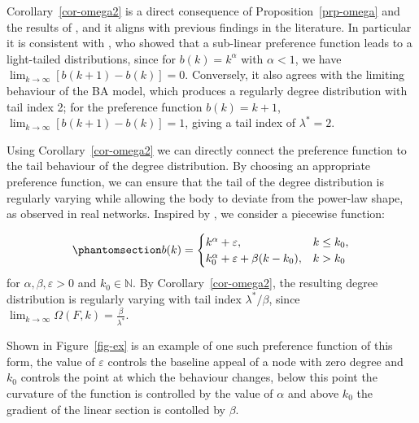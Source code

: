 \documentclass[
  sn-basic,
  10pt,
]{sn-jnl}
\theoremstyle{thmstyleone}
\theoremstyle{thmstyleone}
\theoremstyle{remark}
\theoremstyle{plain}
\theoremstyle{plain}
\theoremstyle{remark}
\begin{document}
Corollary~\ref{cor-omega2} is a direct consequence of
Proposition~\ref{prp-omega} and the results of \citet{shimura12}, and it
aligns with previous findings in the literature. In particular it is
consistent with \citet{krapivsky01}, who showed that a sub-linear
preference function leads to a light-tailed distributions, since for
\(b(k)=k^\alpha\) with \(\alpha<1\), we have
\(\lim_{k\rightarrow\infty}[b(k+1)-b(k)]=0\). Conversely, it also agrees
with the limiting behaviour of the BA model, which produces a regularly
degree distribution with tail index 2; for the preference function
\(b(k)=k+1\), \(\lim_{k\rightarrow\infty}[b(k+1)-b(k)]=1\), giving a
tail index of \(\lambda^*=2\).

Using Corollary~\ref{cor-omega2} we can directly connect the preference
function to the tail behaviour of the degree distribution. By choosing
an appropriate preference function, we can ensure that the tail of the
degree distribution is regularly varying while allowing the body to
deviate from the power-law shape, as observed in real networks. Inspired
by \citet{Lee24}, we consider a piecewise function:

\begin{equation}\phantomsection\label{eq-pref}{
b(k) = \begin{cases}
k^\alpha + \varepsilon,&k\le k_0,\\
k_0^\alpha + \varepsilon + \beta(k-k_0), &k> k_0
\end{cases}
}\end{equation} for \(\alpha,\beta, \varepsilon>0\) and
\(k_0\in\mathbb N\). By Corollary~\ref{cor-omega2}, the resulting degree
distribution is regularly varying with tail index \(\lambda^*/\beta\),
since
\(\lim_{k\rightarrow\infty}\Omega(F,k) = \frac{\beta}{\lambda^*}\).

Shown in Figure~\ref{fig-ex} is an example of one such preference
function of this form, the value of \(\varepsilon\) controls the
baseline appeal of a node with zero degree and \(k_0\) controls the
point at which the behaviour changes, below this point the curvature of
the function is controlled by the value of \(\alpha\) and above \(k_0\)
the gradient of the linear section is contolled by \(\beta\).
\end{document}
